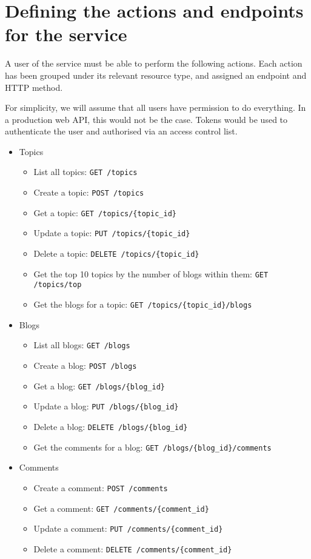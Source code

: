 \section{Defining the actions and endpoints for the service}

A user of the service must be able to perform the following actions. Each action has been grouped under its relevant resource type, and assigned an endpoint and HTTP method.

For simplicity, we will assume that all users have permission to do everything. In a production web API, this would not be the case. Tokens would be used to authenticate the user and authorised via an access control list.

\begin{itemize}
    \item Topics
    \begin{itemize}
        \item List all topics: \verb|GET /topics|
        \item Create a topic: \verb|POST /topics|
        \item Get a topic: \verb|GET /topics/{topic_id}|
        \item Update a topic: \verb|PUT /topics/{topic_id}|
        \item Delete a topic: \verb|DELETE /topics/{topic_id}|
        \item Get the top 10 topics by the number of blogs within them: \verb|GET /topics/top|
        \item Get the blogs for a topic: \verb|GET /topics/{topic_id}/blogs|
    \end{itemize}
    \item Blogs
    \begin{itemize}
        \item List all blogs: \verb|GET /blogs|
        \item Create a blog: \verb|POST /blogs|
        \item Get a blog: \verb|GET /blogs/{blog_id}|
        \item Update a blog: \verb|PUT /blogs/{blog_id}|
        \item Delete a blog: \verb|DELETE /blogs/{blog_id}|
        \item Get the comments for a blog: \verb|GET /blogs/{blog_id}/comments|
    \end{itemize}
    \item Comments
    \begin{itemize}
        \item Create a comment: \verb|POST /comments|
        \item Get a comment: \verb|GET /comments/{comment_id}|
        \item Update a comment: \verb|PUT /comments/{comment_id}|
        \item Delete a comment: \verb|DELETE /comments/{comment_id}|
    \end{itemize}
\end{itemize}

